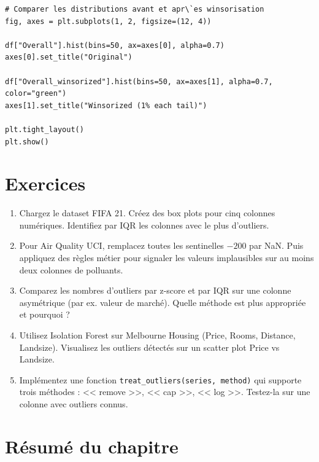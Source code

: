 \begin{verbatim}
# Comparer les distributions avant et apr\`es winsorisation
fig, axes = plt.subplots(1, 2, figsize=(12, 4))

df["Overall"].hist(bins=50, ax=axes[0], alpha=0.7)
axes[0].set_title("Original")

df["Overall_winsorized"].hist(bins=50, ax=axes[1], alpha=0.7, color="green")
axes[1].set_title("Winsorized (1% each tail)")

plt.tight_layout()
plt.show()
\end{verbatim}

\section{Exercices}

\begin{exercise}
\begin{enumerate}
  \item Chargez le dataset FIFA 21. Cr\'eez des box plots pour cinq colonnes num\'eriques. Identifiez par IQR les colonnes avec le plus d'outliers.
  \item Pour Air Quality UCI, remplacez toutes les sentinelles $-200$ par NaN. Puis appliquez des r\`egles m\'etier pour signaler les valeurs implausibles sur au moins deux colonnes de polluants.
  \item Comparez les nombres d'outliers par z-score et par IQR sur une colonne asym\'etrique (par ex. valeur de march\'e). Quelle m\'ethode est plus appropri\'ee et pourquoi ?
  \item Utilisez Isolation Forest sur Melbourne Housing (Price, Rooms, Distance, Landsize). Visualisez les outliers d\'etect\'es sur un scatter plot Price vs Landsize.
  \item Impl\'ementez une fonction \texttt{treat\_outliers(series, method)} qui supporte trois m\'ethodes : << remove >>, << cap >>, << log >>. Testez-la sur une colonne avec outliers connus.
\end{enumerate}
\end{exercise}

\section{R\'esum\'e du chapitre}

